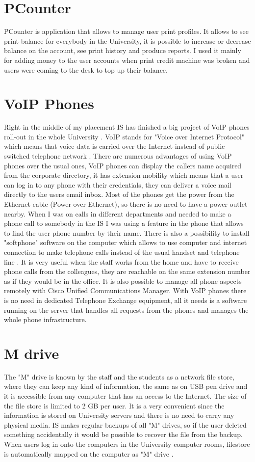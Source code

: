 \documentclass[10pt,a4paper,headinclude=true,twoside]{report}
\begin{document}
\section{PCounter}
PCounter is application that allows to  manage user print profiles. It allows to see print balance for everybody in the University, it is possible to increase or decrease balance on the account, see print history and produce reports. I used it mainly for adding money to the user accounts when print credit machine was broken and users were coming to the desk to top up their balance.

\section{VoIP Phones}
Right in the middle of my placement IS has finished a big project of VoIP phones roll-out in the whole University \cite{VoIP}. VoIP stands for "Voice over Internet Protocol" which means that voice data is carried over the Internet instead of public switched telephone network \cite{VoIP2}. There are numerous advantages of using VoIP phones over the usual ones, VoIP phones can display the callers name acquired from the corporate directory, it has extension mobility which means that a user can log in to any phone with their credentials, they can deliver a voice mail directly to the users email inbox. Most of the phones get the power from the Ethernet cable (Power over Ethernet), so there is no need to have a power outlet nearby. When I was on calls in different departments and needed to make a phone call to somebody in the IS I was using a feature in the phone that allows to find the user phone number by their name. There is also a possibility to install "softphone" software on the computer which allows to use computer and internet connection to make telephone calls instead of the usual handset and telephone line \cite{VoIP3}. It is very useful when the staff works from the home and have to receive phone calls from the colleagues, they are reachable on the same extension number as if they would be in the office. It is also possible to manage all phone aspects remotely with Cisco Unified Communications Manager. With VoIP phones there is no need in dedicated Telephone Exchange equipment, all it needs is a software running on the server that handles all requests from the phones and manages the whole phone infrastructure.
 
\section{M drive}
The "M" drive is known by the staff and the students as a network file store, where they can keep any kind of information, the same as on USB pen drive and it is accessible from any computer that has an access to the Internet. The size of the file store is limited to 2 GB per user.  It is a very convenient since the information is stored on University servers and there is no need to carry any physical media. IS makes regular backups of all "M" drives, so if the user deleted something accidentally it would be possible to recover the file from the backup. When users log in onto the computers in the University computer rooms, filestore is automatically mapped on the computer as "M" drive \cite{MDrive}.
\end{document}
